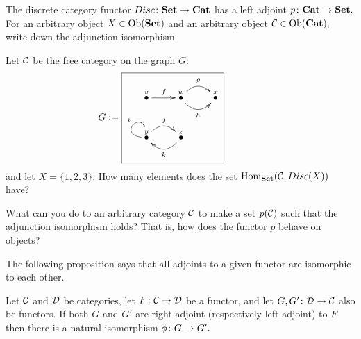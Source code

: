 \documentclass[CT4S-EN-RU]{subfiles}
\begin{document}
\begin{exerciseRUS}
\end{exerciseRUS}

\begin{exerciseENG}
The discrete category functor $Disc\colon{\mathbf{Set}}\rightarrow{\mathbf{Cat}}$ has a left adjoint $p\colon{\mathbf{Cat}}\rightarrow{\mathbf{Set}}.$ 
\sexc For an arbitrary object $X\in\operatorname{Ob}({\mathbf{Set}})$ and an arbitrary object $\mathcal{C}\in\operatorname{Ob}({\mathbf{Cat}}),$ write down the adjunction isomorphism.
\item Let $\mathcal{C}$ be the free category on the graph $G$:
$$
G:=\parbox{2in}{\fbox{\xymatrix{\LMO{v}\ar[r]^f&\LMO{w}\ar@/_1pc/[r]_h\ar@/^1pc/[r]^g&\LMO{x}\\\LMO{y}\ar@(l,u)[]^i\ar@/^1pc/[r]^j&\LMO{z}\ar@/^1pc/[l]^k}}}
$$
and let $X=\{1,2,3\}.$ How many elements does the set $\operatorname{Hom}_{\mathbf{Set}}(\mathcal{C},Disc(X))$ have?
\item What can you do to an arbitrary category $\mathcal{C}$ to make a set $p(\mathcal{C})$ such that the adjunction isomorphism holds? That is, how does the functor $p$ behave on objects?
\endsexc
\end{exerciseENG}

\begin{exerciseRUS}
\end{exerciseRUS}

\begin{blockENG}
The following proposition says that all adjoints to a given functor are isomorphic to each other. 
\end{blockENG}

\begin{blockRUS}
\end{blockRUS}

\begin{propositionENG}\label{prop:unicity of adjoints}
Let $\mathcal{C}$ and $\mathcal{D}$ be categories, let $F\colon\mathcal{C}\rightarrow\mathcal{D}$ be a functor, and let $G,G'\colon\mathcal{D}\rightarrow\mathcal{C}$ also be functors. If both $G$ and $G'$ are right adjoint (respectively left adjoint) to $F$ then there is a natural isomorphism $\phi\colon G\rightarrow G'.$
\end{propositionENG}

\begin{propositionRUS}\label{prop:unicity of adjoints}
\end{propositionRUS}
\end{document}
